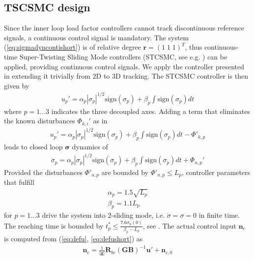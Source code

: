 \documentclass{ifacconf}
\providecommand{\mbf}[1]{\mathbf{#1}}
\newcommand{\idxAxis}{{\ensuremath{p}}}
\begin{document}
\subsection{TSCSMC design}
Since the inner loop load factor controllers cannot track discontinuous reference signals, a continuous control signal is mandatory.
The system (\ref{eq:sigmadyncontishort}) is of relative degree $\mbf{r} = (1 \; 1 \; 1)^T$, thus continuous-time Super-Twisting Sliding Mode controllers (STCSMC, see e.g. \cite{shtessel2014sliding}) can be applied, providing continuous control signals.
We apply the controller presented in \cite{galzi2006uav} extending it trivially from 2D to 3D tracking.
The STCSMC controller is then given by
\begin{align}
u_\idxAxis' = \alpha_\idxAxis |\sigma_\idxAxis|^{1/2}\mathrm{sign}(\sigma_\idxAxis) + \beta_\idxAxis \int \mathrm{sign}(\sigma_\idxAxis) dt
\end{align}
where $\idxAxis = 1...3$ indicates the three decoupled axes. Adding a term that eliminates the known disturbances ${\Phi}_{k,i}'$ as in \cite{galzi2006uav}
\begin{align}
u_\idxAxis' = \alpha_\idxAxis |\sigma_\idxAxis|^{1/2}\mathrm{sign}(\sigma_\idxAxis) + \beta_\idxAxis \int \mathrm{sign}(\sigma_\idxAxis) dt - {\Phi}'_{k,\idxAxis}
\end{align}
leads to closed loop $\mbf{\sigma}$ dynamics of
\begin{align}
\dot{\sigma}_\idxAxis = \alpha_\idxAxis |\sigma_\idxAxis|^{1/2}\mathrm{sign}(\sigma_\idxAxis) + \beta_\idxAxis \int \mathrm{sign}(\sigma_\idxAxis) dt + \Phi_{u,\idxAxis}'
\end{align}
Provided the disturbances $\Phi'_{u,\idxAxis}$ are bounded by $\Phi'_{u,\idxAxis} \leq L_\idxAxis$, controller parameters that fulfill
\begin{align}
\alpha_\idxAxis = 1.5 \sqrt{L_\idxAxis}
\label{eq:csmcgainconditionalpha}\\
\beta_\idxAxis = 1.1 L_\idxAxis
\label{eq:csmcgainconditionbeta}
\end{align}
for $\idxAxis=1...3$ drive the system into 2-sliding mode, i.e. $\dot{\sigma} = \sigma = 0$ in finite time. The reaching time is bounded by $t_\idxAxis^* \leq \frac{7.6 \sigma_\idxAxis(0)}{\beta_\idxAxis - L_\idxAxis}$, see \cite{galzi2006uav}.
The actual control input $\mbf{n}_c$ is computed from (\ref{eq:defu}, \ref{eq:defushort}) as
\begin{align}
\mbf{n}_c = \frac{1}{|\mbf{g}|} \mbf{R}_{be}(\mbf{GB})^{-1} \mbf{u}' + \mbf{n}_{c,0}
\end{align}
\end{document}
